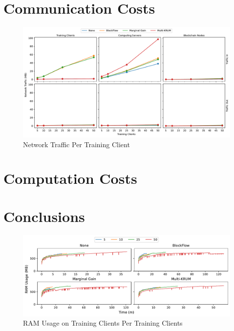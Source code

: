 \section{Communication Costs}

\begin{figure}[!h]
    \centering
    \includegraphics[width=\textwidth]{graphics/clients/traffic.pdf}
    \caption{Network Traffic Per Training Client}
    \label{fig:net_clients}
\end{figure}


\section{Computation Costs}


\section{Conclusions} %

\clearpage

\begin{figure}[!h]
    \centering
    \includegraphics[width=\textwidth]{graphics/clients/ram_client.pdf}
    \caption{RAM Usage on Training Clients Per Training Clients}
    \label{fig:ram_clients_clients}
\end{figure}

